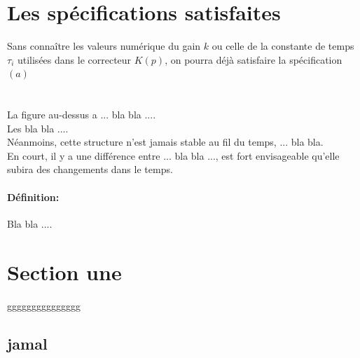 \documentclass[12pt, a4paper, openany]{report}
\begin{document}
 \section{Les spécifications satisfaites}
 
  Sans connaître les valeurs numérique du gain $k$ ou celle de la constante de temps $\tau_{i}$ utilisées dans le correcteur $K(p)$, on pourra déjà satisfaire la spécification $(a)$
  
 \section{}  

      
 
 
 
 
 
 
 La figure au-dessus a ... bla bla ....\\
 
 Les bla bla ....\\
 
 Néanmoins, cette structure n’est jamais stable au fil du temps, ... bla bla.\\
  
 En court, il y a une différence entre ... bla bla ..., est fort envisageable qu’elle subira des changements dans le temps.
 
 \paragraph{Définition:}
  Bla bla ....

 \section{Section une}
  ggggggggggggggg
  \subsection{jamal}
\end{document}
